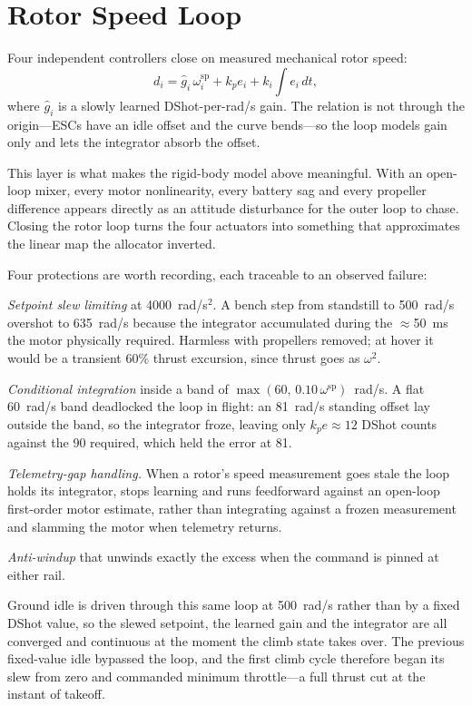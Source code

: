 \documentclass[conference]{IEEEtran}
\begin{document}
\section{Rotor Speed Loop}
\label{sec:rotor}

Four independent controllers close on measured mechanical rotor speed:
\begin{equation}
d_i = \hat{g}_i\,\omega_i^{\text{sp}} + k_p e_i + k_i\!\!\int\!\! e_i\,dt,
\end{equation}
where $\hat{g}_i$ is a slowly learned DShot-per-rad/s gain. The relation is
not through the origin---ESCs have an idle offset and the curve bends---so the
loop models gain only and lets the integrator absorb the offset.

This layer is what makes the rigid-body model above meaningful. With an
open-loop mixer, every motor nonlinearity, every battery sag and every
propeller difference appears directly as an attitude disturbance for the outer
loop to chase. Closing the rotor loop turns the four actuators into something
that approximates the linear map the allocator inverted.

Four protections are worth recording, each traceable to an observed failure:

\emph{Setpoint slew limiting} at 4000~rad/s$^{2}$. A bench step from standstill
to 500~rad/s overshot to 635~rad/s because the integrator accumulated during
the $\approx$50~ms the motor physically required. Harmless with propellers
removed; at hover it would be a transient 60\% thrust excursion, since thrust
goes as $\omega^{2}$.

\emph{Conditional integration} inside a band of
$\max(60,\,0.10\,\omega^{\text{sp}})$~rad/s. A flat 60~rad/s band deadlocked
the loop in flight: an 81~rad/s standing offset lay outside the band, so the
integrator froze, leaving only $k_p e \approx 12$ DShot counts against the 90
required, which held the error at 81.

\emph{Telemetry-gap handling.} When a rotor's speed measurement goes stale the
loop holds its integrator, stops learning and runs feedforward against an
open-loop first-order motor estimate, rather than integrating against a frozen
measurement and slamming the motor when telemetry returns.

\emph{Anti-windup} that unwinds exactly the excess when the command is pinned
at either rail.

Ground idle is driven through this same loop at 500~rad/s rather than by a
fixed DShot value, so the slewed setpoint, the learned gain and the integrator
are all converged and continuous at the moment the climb state takes over. The
previous fixed-value idle bypassed the loop, and the first climb cycle
therefore began its slew from zero and commanded minimum throttle---a full
thrust cut at the instant of takeoff.
\end{document}
